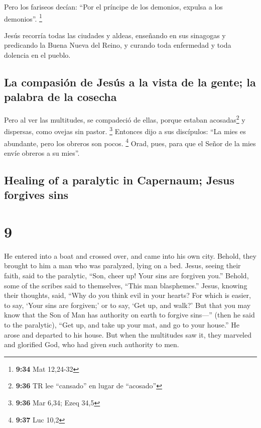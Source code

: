 \begin{paracol}{2}
 Pero los fariseos decían: ``Por el príncipe de los
demonios, expulsa a los demonios''. \footnote{\textbf{9:34} Mat 12,24-32}

 Jesús recorría todas las ciudades y aldeas, enseñando en
sus sinagogas y predicando la Buena Nueva del Reino, y curando toda
enfermedad y toda dolencia en el pueblo.

\hypertarget{la-compasiuxf3n-de-jesuxfas-a-la-vista-de-la-gente-la-palabra-de-la-cosecha}{%
\subsection{La compasión de Jesús a la vista de la gente; la palabra de
la
cosecha}\label{la-compasiuxf3n-de-jesuxfas-a-la-vista-de-la-gente-la-palabra-de-la-cosecha}}

 Pero al ver las multitudes, se compadeció de ellas,
porque estaban acosadas\footnote{\textbf{9:36} TR lee ``cansado'' en
  lugar de ``acosado''} y dispersas, como ovejas sin pastor. \footnote{\textbf{9:36}
  Mar 6,34; Ezeq 34,5}  Entonces dijo a sus discípulos:
``La mies es abundante, pero los obreros son pocos. \footnote{\textbf{9:37}
  Luc 10,2}  Orad, pues, para que el Señor de la mies
envíe obreros a su mies''.

\switchcolumn
\begin{otherlanguage}{english}

\hypertarget{healing-of-a-paralytic-in-capernaum-jesus-forgives-sins}{%
\subsection{Healing of a paralytic in Capernaum; Jesus forgives
sins}\label{healing-of-a-paralytic-in-capernaum-jesus-forgives-sins}}

\hypertarget{section-17}{%
\section{9}\label{section-17}}

 He entered into a boat and crossed over, and came into
his own city.  Behold, they brought to him a man who was
paralyzed, lying on a bed. Jesus, seeing their faith, said to the
paralytic, ``Son, cheer up! Your sins are forgiven you.'' 
Behold, some of the scribes said to themselves, ``This man blasphemes.''
 Jesus, knowing their thoughts, said, ``Why do you think
evil in your hearts?  For which is easier, to say, `Your
sins are forgiven;' or to say, `Get up, and walk?'  But
that you may know that the Son of Man has authority on earth to forgive
sins---'' (then he said to the paralytic), ``Get up, and take up your
mat, and go to your house.''  He arose and departed to his
house.  But when the multitudes saw it, they marveled and
glorified God, who had given such authority to men.


\end{otherlanguage}
\end{paracol}
